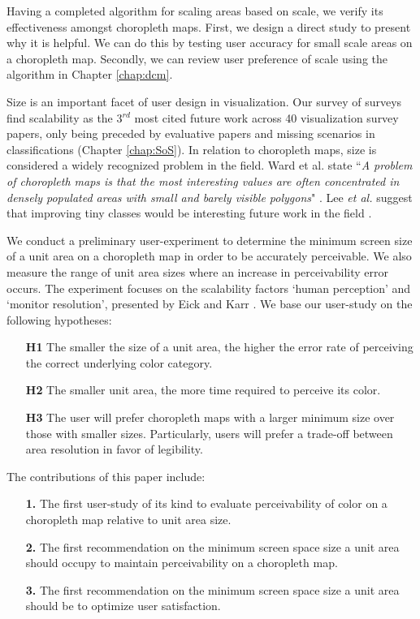 Having a completed algorithm for scaling areas based on scale, we verify its effectiveness amongst choropleth maps. First, we design a direct study to present why it is helpful. We can do this by testing user accuracy for small scale areas on a choropleth map. Secondly, we can review user preference of scale using the algorithm in Chapter \ref{chap:dcm}.

Size is an important facet of user design in visualization. Our survey of surveys find scalability as the 3$^{rd}$ most cited future work across 40 visualization survey papers, only being preceded by evaluative papers and missing scenarios in classifications (Chapter \ref{chap:SoS}). In relation to choropleth maps, size is considered a widely recognized problem in the field. Ward et al. state ``\textit{A problem of choropleth maps is that the most interesting values are often concentrated in densely populated areas with small and barely visible polygons}" \cite{ward2010interactive}. Lee \textit{et al.} suggest that improving tiny classes would be interesting future work in the field \cite{lee2013perceptually}.

We conduct a preliminary user-experiment to determine the minimum screen size of a unit area on a choropleth map in order to be accurately perceivable. We also measure the range of unit area sizes where an increase in perceivability error occurs. The experiment focuses on the scalability factors `human perception' and `monitor resolution', presented by Eick and Karr \cite{eick2002visual}.  We base our user-study on the following hypotheses:
\begin{itemize}[labelindent=1em, labelsep=0.2cm, leftmargin=*]
\item[\textbf{H1}]The smaller the size of a unit area, the higher the error rate of perceiving the correct underlying color category.
\item[\textbf{H2}]The smaller unit area, the more time required to perceive its color.
\item[\textbf{H3}]The user will prefer choropleth maps with a larger minimum size over those with smaller sizes. Particularly, users will prefer a trade-off between area resolution in favor of legibility.
\end{itemize}

The contributions of this paper include:
\begin{itemize}[labelindent=1em, labelsep=0.2cm, leftmargin=*]
\item[\textbf{1.}] The first user-study of its kind to evaluate perceivability of color on a choropleth map relative to unit area size.
\item[\textbf{2.}] The first recommendation on the minimum screen space size a unit area should occupy to maintain perceivability on a choropleth map.
\item[\textbf{3.}] The first recommendation on the minimum screen space size a unit area should be to optimize user satisfaction.
\end{itemize}

